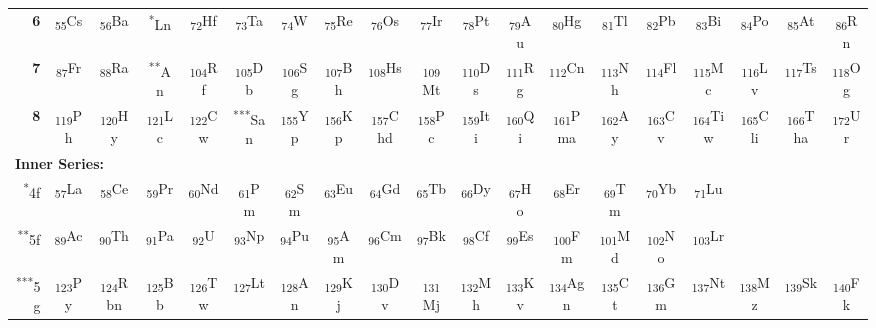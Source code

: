 \documentclass[10pt,twocolumn,a4paper]{article}
\begin{document}
\begin{table}[t]
\begin{tabular}{rcccccccccccccccccc}
\textbf{6} & \textsubscript{55}Cs & \textsubscript{56}Ba & \textsuperscript{*}Ln & \textsubscript{72}Hf & \textsubscript{73}Ta & \textsubscript{74}W & \textsubscript{75}Re & \textsubscript{76}Os & \textsubscript{77}Ir & \textsubscript{78}Pt & \textsubscript{79}Au & \textsubscript{80}Hg & \textsubscript{81}Tl & \textsubscript{82}Pb & \textsubscript{83}Bi & \textsubscript{84}Po & \textsubscript{85}At & \textsubscript{86}Rn \\
\textbf{7} & \textsubscript{87}Fr & \textsubscript{88}Ra & \textsuperscript{**}An & \textsubscript{104}Rf & \textsubscript{105}Db & \textsubscript{106}Sg & \textsubscript{107}Bh & \textsubscript{108}Hs & \textsubscript{109}Mt & \textsubscript{110}Ds & \textsubscript{111}Rg & \textsubscript{112}Cn & \textsubscript{113}Nh & \textsubscript{114}Fl & \textsubscript{115}Mc & \textsubscript{116}Lv & \textsubscript{117}Ts & \textsubscript{118}Og \\
\textbf{8} & \textsubscript{119}Ph & \textsubscript{120}Hy & \textsubscript{121}Lc & \textsubscript{122}Cw & \textsuperscript{***}San & \textsubscript{155}Yp & \textsubscript{156}Kp & \textsubscript{157}Chd & \textsubscript{158}Pc & \textsubscript{159}Iti & \textsubscript{160}Qi & \textsubscript{161}Pma & \textsubscript{162}Ay & \textsubscript{163}Cv & \textsubscript{164}Tiw & \textsubscript{165}Cli & \textsubscript{166}Tha & \textsubscript{172}Ur \\
\midrule
\multicolumn{19}{l}{\textbf{Inner Series:}} \\
\textsuperscript{*}4f & \textsubscript{57}La & \textsubscript{58}Ce & \textsubscript{59}Pr & \textsubscript{60}Nd & \textsubscript{61}Pm & \textsubscript{62}Sm & \textsubscript{63}Eu & \textsubscript{64}Gd & \textsubscript{65}Tb & \textsubscript{66}Dy & \textsubscript{67}Ho & \textsubscript{68}Er & \textsubscript{69}Tm & \textsubscript{70}Yb & \textsubscript{71}Lu & & & \\
\textsuperscript{**}5f & \textsubscript{89}Ac & \textsubscript{90}Th & \textsubscript{91}Pa & \textsubscript{92}U & \textsubscript{93}Np & \textsubscript{94}Pu & \textsubscript{95}Am & \textsubscript{96}Cm & \textsubscript{97}Bk & \textsubscript{98}Cf & \textsubscript{99}Es & \textsubscript{100}Fm & \textsubscript{101}Md & \textsubscript{102}No & \textsubscript{103}Lr & & & \\
\textsuperscript{***}5g & \textsubscript{123}Py & \textsubscript{124}Rbn & \textsubscript{125}Bb & \textsubscript{126}Tw & \textsubscript{127}Lt & \textsubscript{128}An & \textsubscript{129}Kj & \textsubscript{130}Dv & \textsubscript{131}Mj & \textsubscript{132}Mh & \textsubscript{133}Kv & \textsubscript{134}Agn & \textsubscript{135}Ct & \textsubscript{136}Gm & \textsubscript{137}Nt & \textsubscript{138}Mz & \textsubscript{139}Sk & \textsubscript{140}Fk \\

\end{tabular}
\end{table}
\end{document}
